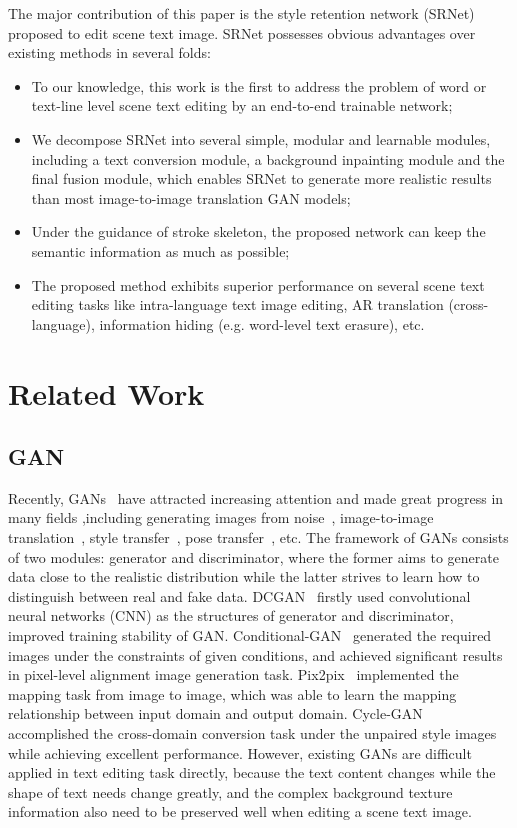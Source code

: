 \documentclass[sigconf]{acmart}
\begin{document}
The major contribution of this paper is the style retention network (SRNet) proposed to edit scene text image. SRNet possesses obvious advantages over existing methods in several folds: 
\begin{itemize}
\vspace{-0.1cm}
\item[] To our knowledge, this work is the first to address the problem of word or text-line level scene text editing by an end-to-end trainable network; 
\item[] We decompose SRNet into several simple, modular and learnable modules, including a text conversion module, a background inpainting module and the final fusion module, which enables SRNet to generate more realistic results than most image-to-image translation GAN models;
\item[] Under the guidance of stroke skeleton, the proposed network can keep the semantic information as much as possible;
\item[] The proposed method exhibits superior performance on several scene text editing tasks like intra-language text image editing, AR translation (cross-language), information hiding (e.g. word-level text erasure), etc.
\end{itemize}

\section{Related Work}

\subsection{GAN}
Recently, GANs~\cite{goodfellow2014generative} have attracted increasing attention and made great progress in many fields ,including generating images from noise~\cite{mirza2014conditional}, image-to-image translation~\cite{isola2017image}, style transfer~\cite{zhu2017unpaired}, pose transfer~\cite{zhu2019progressive}, etc. 
The framework of GANs consists of two modules: generator and discriminator, where the former aims to generate data close to the realistic distribution while the latter strives to learn how to distinguish between real and fake data. DCGAN~\cite{radford2015unsupervised} firstly used convolutional neural networks (CNN) as the structures of generator and discriminator, improved training stability of GAN. Conditional-GAN~\cite{mirza2014conditional} generated the required images under the constraints of given conditions, and achieved significant results in pixel-level alignment image generation task. Pix2pix~\cite{isola2017image} implemented the mapping task from image to image, which was able to learn the mapping relationship between input domain and output domain. Cycle-GAN~\cite{zhu2017unpaired} accomplished the cross-domain conversion task under the unpaired style images while achieving excellent performance. However, existing GANs are difficult applied in text editing task directly, because the text content changes while the shape of text needs change greatly, and the complex background texture information also need to be preserved well when editing a scene text image.
\end{document}
